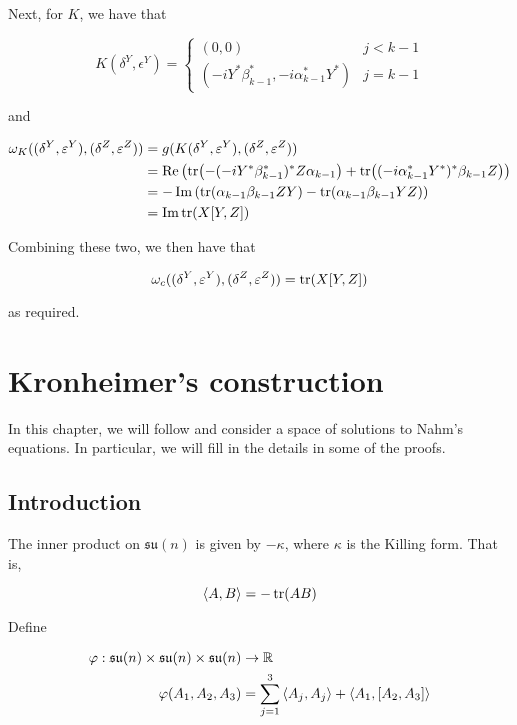 \documentclass{report}
\newcommand{\su}{\mathfrak{su}}
\begin{document}
Next, for \(K\), we have that

\[K(\delta^Y, \epsilon^Y) = \begin{cases}
    (0, 0) & j < k - 1 \\
    (-iY^*\beta_{k-1}^*, -i\alpha_{k-1}^*Y^*) & j = k - 1
\end{cases}\]

and

\begin{align*}
    \omega_K((\delta^Y, \varepsilon^Y), (\delta^Z, \varepsilon^Z)) &= g(K(\delta^Y, \varepsilon^Y), (\delta^Z, \varepsilon^Z)) \\
    &= \Re \left(\tr(-(-iY^*\beta_{k-1}^*)^*Z\alpha_{k-1}) + \tr((-i\alpha_{k-1}^*Y^*)^*\beta_{k-1}Z)\right) \\
    &= -\Im\left(\tr(\alpha_{k-1}\beta_{k-1}ZY) - \tr(\alpha_{k-1}\beta_{k-1}YZ)\right) \\
    &= \Im \tr(X[Y, Z])
\end{align*}

Combining these two, we then have that

\[\omega_c((\delta^Y, \varepsilon^Y), (\delta^Z, \varepsilon^Z)) = \tr(X[Y, Z])\]

as required.

\chapter{Kronheimer's construction}

\label{chapter:Kronheimer-nilpotent}

In this chapter, we will follow \cite{kronheimer_instantons_1990} and consider a space of solutions to Nahm's equations. In particular, we will fill in the details in some of the proofs.

\section{Introduction}

The inner product on \(\su(n)\) is given by \(-\kappa\), where \(\kappa\) is the Killing form. That is,

\[\left\langle A, B \right\rangle = -\tr(AB)\]

Define

\begin{align*}
    \varphi : \su(n) \times \su(n) \times \su(n) &\to \R \\
    \varphi(A_1, A_2, A_3) &= \sum_{j=1}^3 \inner{A_j, A_j} + \inner{A_1, [A_2, A_3]}
\end{align*}
\end{document}
